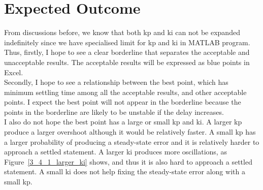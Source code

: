 \section{Expected Outcome} %
\label{section4.2}

From discussions before, we know that both kp and ki can not be expanded indefinitely since we have specialised limit for kp and ki in MATLAB program. Thus, firstly, I hope to see a clear borderline that separates the acceptable and unacceptable results. The acceptable results will be expressed as blue points in Excel.  \\

Secondly, I hope to see a relationship between the best point, which has minimum settling time among all the acceptable results, and other acceptable points. I expect the best point will not appear in the borderline because the points in the borderline are likely to be unstable if the delay increases.  \\

I also do not hope the best point has a large or small kp and ki. A larger kp produce a larger overshoot although it would be relatively faster. A small kp has a larger probability of producing a steady-state error and it is relatively harder to approach a settled statement. A larger ki produces more oscillations, as Figure~\ref{3_4_1_larger_ki} shows, and thus it is also hard to approach a settled statement. A small ki does not help fixing the steady-state error along with a small kp.\\